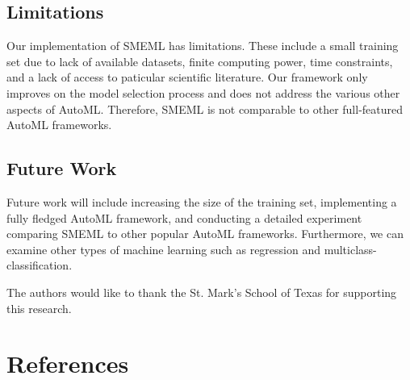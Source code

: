 \documentclass{article}
\begin{document}
\subsection{Limitations}
Our implementation of SMEML has limitations. These include a small training set due to lack of available datasets, finite computing power, time constraints, and a lack of access to paticular scientific literature. Our framework only improves on the model selection process and does not address the various other aspects of AutoML. Therefore, SMEML is not comparable to other full-featured AutoML frameworks.
\subsection{Future Work}
Future work will include increasing the size of the training set, implementing a fully fledged AutoML framework, and conducting a detailed experiment comparing SMEML to other popular AutoML frameworks. Furthermore, we can examine other types of machine learning such as regression and multiclass-classification.
\begin{ack}
The authors would like to thank the St. Mark's School of Texas for supporting this research.
\end{ack}

\section*{References}
\end{document}
